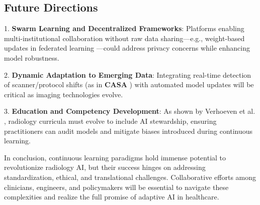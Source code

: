 \documentclass{IEEEcsmag}
\begin{document}
    \subsection{Future Directions}
    1. \textbf{Swarm Learning and Decentralized Frameworks}: Platforms enabling multi-institutional collaboration without raw data sharing—e.g., weight-based updates in federated learning \cite{cite-6}—could address privacy concerns while enhancing model robustness.
    
    2. \textbf{Dynamic Adaptation to Emerging Data}: Integrating real-time detection of scanner/protocol shifts (as in \textbf{CASA} \cite{cite-10}) with automated model updates will be critical as imaging technologies evolve.
    
    3. \textbf{Education and Competency Development}: As shown by Verhoeven et al. \cite{cite-8}, radiology curricula must evolve to include AI stewardship, ensuring practitioners can audit models and mitigate biases introduced during continuous learning.
    
    In conclusion, continuous learning paradigms hold immense potential to revolutionize radiology AI, but their success hinges on addressing standardization, ethical, and translational challenges. Collaborative efforts among clinicians, engineers, and policymakers will be essential to navigate these complexities and realize the full promise of adaptive AI in healthcare.
    
\end{document}
